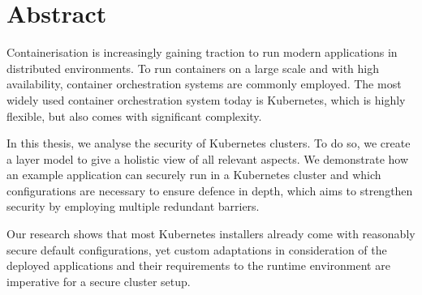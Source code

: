 

\chapter*{\centering Abstract} \label{cha:abstract}

Containerisation is increasingly gaining traction to run modern applications in distributed environments. To run containers on a large scale and with high availability, container orchestration systems are commonly employed. The most widely used container orchestration system today is Kubernetes, which is highly flexible, but also comes with significant complexity.

In this thesis, we analyse the security of Kubernetes clusters. To do so, we create a layer model to give a holistic view of all relevant aspects. We demonstrate how an example application can securely run in a Kubernetes cluster and which configurations are necessary to ensure defence in depth, which aims to strengthen security by employing multiple redundant barriers.

Our research shows that most Kubernetes installers already come with reasonably secure default configurations, yet custom adaptations in consideration of the deployed applications and their requirements to the runtime environment are imperative for a secure cluster setup.



